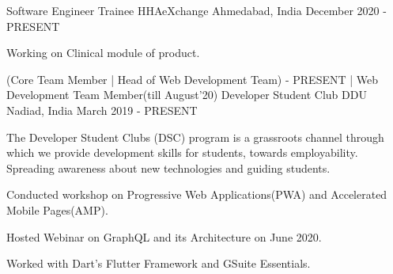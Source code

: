 
\begin{cventries}
  \cventry
    {Software Engineer Trainee} %
    {HHAeXchange} %
    {Ahmedabad, India} %
    {December 2020 - PRESENT} %
    {
      \begin{cvitems} %
        \item {Working on Clinical module of product.}
      \end{cvitems}
    }
  \cventry
    {(Core Team Member | Head of Web Development Team) - PRESENT | Web Development Team Member(till August'20)} %
    {Developer Student Club DDU} %
    {Nadiad, India} %
    {March 2019 - PRESENT} %
    {
      \begin{cvitems} %
        \item {The Developer Student Clubs (DSC) program is a grassroots channel through which we provide development skills for students, towards employability. Spreading awareness about new technologies and guiding students.}
        \item{Conducted workshop on Progressive Web Applications(PWA) and Accelerated Mobile Pages(AMP).}
        \item{Hosted Webinar on GraphQL and its Architecture on June 2020.}
        \item{Worked with Dart's Flutter Framework and GSuite Essentials.}
      \end{cvitems}
    }

    
\end{cventries}
